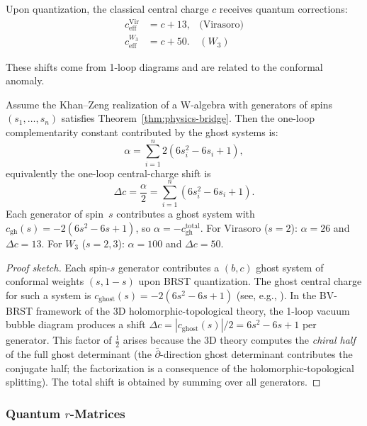 Upon quantization, the classical central charge $c$ receives quantum corrections:
\begin{align}
c_{\text{eff}}^{\text{Vir}} &= c + 13, & \text{(Virasoro)}\\
c_{\text{eff}}^{W_3} &= c + 50. & (W_3)
\end{align}

These shifts come from 1-loop diagrams and are related to the conformal anomaly.

\begin{theorem}
Assume the Khan--Zeng realization of a W-algebra with generators of
spins $(s_1, \ldots, s_n)$ satisfies
Theorem~\ref{thm:physics-bridge}. Then the one-loop complementarity
constant contributed by the ghost systems is:
\begin{equation}
\alpha = \sum_{i=1}^n 2(6s_i^2 - 6s_i + 1),
\end{equation}
equivalently the one-loop central-charge shift is
\[
\Delta c = \frac{\alpha}{2}
= \sum_{i=1}^n (6s_i^2 - 6s_i + 1).
\]
Each generator of spin~$s$ contributes a ghost system with
$c_{\mathrm{gh}}(s) = -2(6s^2 - 6s + 1)$, so
$\alpha = -c_{\mathrm{gh}}^{\mathrm{total}}$.
For Virasoro ($s=2$): $\alpha = 26$ and $\Delta c = 13$.
For $W_3$ ($s=2,3$): $\alpha = 100$ and $\Delta c = 50$.
\end{theorem}

\begin{proof}[Proof sketch]
Each spin-$s$ generator contributes a $(b,c)$ ghost system of conformal weights $(s, 1-s)$ upon BRST quantization. The ghost central charge for such a system is $c_{\text{ghost}}(s) = -2(6s^2 - 6s + 1)$ (see, e.g., \cite{FMS86,Pol98}). In the BV-BRST framework of the 3D holomorphic-topological theory, the 1-loop vacuum bubble diagram produces a shift $\Delta c = |c_{\text{ghost}}(s)|/2 = 6s^2 - 6s + 1$ per generator. This factor of $\tfrac{1}{2}$ arises because the 3D theory computes the \emph{chiral half} of the full ghost determinant (the $\bar\partial$-direction ghost determinant contributes the conjugate half; the factorization is a consequence of the holomorphic-topological splitting). The total shift is obtained by summing over all generators.
\end{proof}

\subsubsection{Quantum $r$-Matrices}

